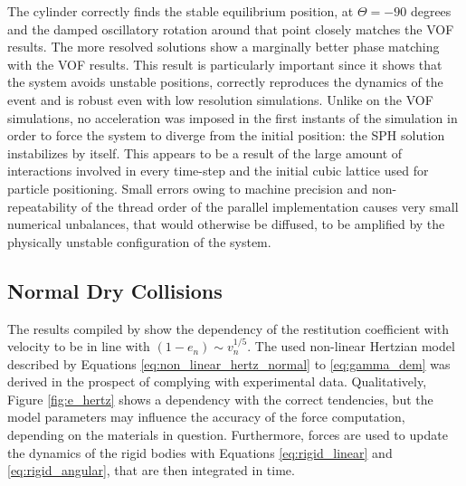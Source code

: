 The cylinder correctly finds the stable equilibrium position, at $\Theta=-90$ degrees and the damped oscillatory rotation around that point closely matches the \ac{VOF} results. The more resolved solutions show a marginally better phase matching with the \ac{VOF} results. This result is particularly important since it shows that the system avoids unstable positions, correctly reproduces the dynamics of the event and is robust even with low resolution simulations. Unlike on the \ac{VOF} simulations, no acceleration was imposed in the first instants of the simulation in order to force the system to diverge from the initial position: the \ac{SPH} solution instabilizes by itself. This appears to be a result of the large amount of interactions involved in every time-step and the initial cubic lattice used for particle positioning. Small errors owing to machine precision and non-repeatability of the thread order of the parallel implementation \citep{Dominguez-2013a} causes very small numerical unbalances, that would otherwise be diffused, to be amplified by the physically unstable configuration of the system.


\subsection{Normal Dry Collisions}
\label{sec:validation_dry_collision}

The results compiled by \cite{Kruggel-Emden-2007} show the dependency of the restitution coefficient with velocity to be in line with $(1-e_n)\sim v_{n}^{1/5}$. The used non-linear Hertzian model described by Equations \eqref{eq:non_linear_hertz_normal} to \eqref{eq:gamma_dem} was derived in the prospect of complying with experimental data. Qualitatively, Figure \ref{fig:e_hertz} shows a dependency with the correct tendencies, but the model parameters may influence the accuracy of the force computation, depending on the materials in question. Furthermore, forces are used to update the dynamics of the rigid bodies with Equations \eqref{eq:rigid_linear} and \eqref{eq:rigid_angular}, that are then integrated in time.

